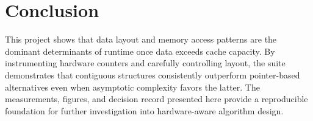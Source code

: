 \documentclass[11pt]{article}
\begin{document}
\section{Conclusion}
This project shows that data layout and memory access patterns are the dominant determinants of runtime once data exceeds cache capacity. By instrumenting hardware counters and carefully controlling layout, the suite demonstrates that contiguous structures consistently outperform pointer-based alternatives even when asymptotic complexity favors the latter. The measurements, figures, and decision record presented here provide a reproducible foundation for further investigation into hardware-aware algorithm design.

\clearpage



\appendix

\end{document}
